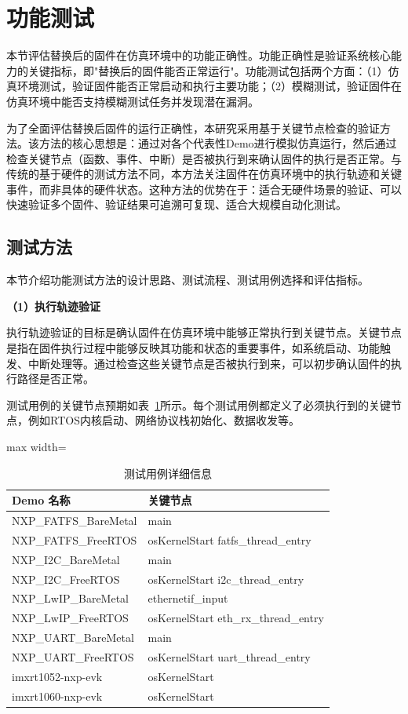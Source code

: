 \section{功能测试}
\label{sec:functional_test}

本节评估替换后的固件在仿真环境中的功能正确性。功能正确性是验证系统核心能力的关键指标，即"替换后的固件能否正常运行"。功能测试包括两个方面：（1）仿真环境测试，验证固件能否正常启动和执行主要功能；（2）模糊测试，验证固件在仿真环境中能否支持模糊测试任务并发现潜在漏洞。

为了全面评估替换后固件的运行正确性，本研究采用基于关键节点检查的验证方法。该方法的核心思想是：通过对各个代表性Demo进行模拟仿真运行，然后通过检查关键节点（函数、事件、中断）是否被执行到来确认固件的执行是否正常。与传统的基于硬件的测试方法不同，本方法关注固件在仿真环境中的执行轨迹和关键事件，而非具体的硬件状态。这种方法的优势在于：适合无硬件场景的验证、可以快速验证多个固件、验证结果可追溯可复现、适合大规模自动化测试。

\subsection{测试方法}

本节介绍功能测试方法的设计思路、测试流程、测试用例选择和评估指标。

\textbf{（1）执行轨迹验证}

执行轨迹验证的目标是确认固件在仿真环境中能够正常执行到关键节点。关键节点是指在固件执行过程中能够反映其功能和状态的重要事件，如系统启动、功能触发、中断处理等。通过检查这些关键节点是否被执行到来，可以初步确认固件的执行路径是否正常。

测试用例的关键节点预期如表~\ref{tab:testcases}所示。每个测试用例都定义了必须执行到的关键节点，例如RTOS内核启动、网络协议栈初始化、数据收发等。

\begin{table}[htbp]
\centering
\caption{测试用例详细信息}
\label{tab:testcases}
\small
\begin{adjustbox}{max width=\textwidth}
\begin{tabular}{ll}
\toprule
\textbf{Demo 名称} & \textbf{关键节点} \\
\midrule
NXP\_FATFS\_BareMetal & main \\
NXP\_FATFS\_FreeRTOS & osKernelStart fatfs\_thread\_entry \\
NXP\_I2C\_BareMetal & main \\
NXP\_I2C\_FreeRTOS & osKernelStart i2c\_thread\_entry \\
NXP\_LwIP\_BareMetal & ethernetif\_input \\
NXP\_LwIP\_FreeRTOS & osKernelStart eth\_rx\_thread\_entry \\
NXP\_UART\_BareMetal & main \\
NXP\_UART\_FreeRTOS & osKernelStart uart\_thread\_entry \\
imxrt1052-nxp-evk & osKernelStart \\
imxrt1060-nxp-evk & osKernelStart \\
\bottomrule
\end{tabular}
\end{adjustbox}
\end{table}

